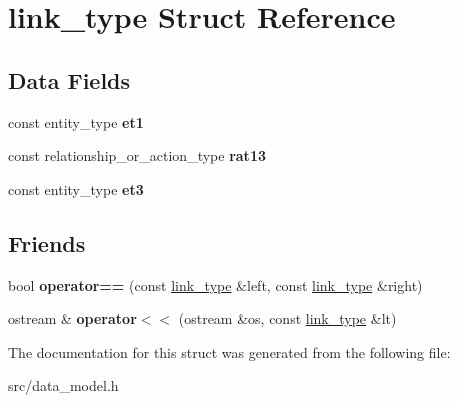 \hypertarget{structlink__type}{}\section{link\+\_\+type Struct Reference}
\label{structlink__type}
\subsection*{Data Fields}
\begin{DoxyCompactItemize}
\item 
\mbox{\label{structlink__type_aa1e1406306efb10b6c71e6425df2405d}} 
const entity\+\_\+type {\bfseries et1}
\item 
\mbox{\label{structlink__type_ac178aea7e3b72e3579ea365625291c4a}} 
const relationship\+\_\+or\+\_\+action\+\_\+type {\bfseries rat13}
\item 
\mbox{\label{structlink__type_a5d2db20b11fedaab93e193fce2e205a8}} 
const entity\+\_\+type {\bfseries et3}
\end{DoxyCompactItemize}
\subsection*{Friends}
\begin{DoxyCompactItemize}
\item 
\mbox{\label{structlink__type_ae75460e218908d70af1163248317096e}} 
bool {\bfseries operator==} (const \hyperlink{structlink__type}{link\+\_\+type} \&left, const \hyperlink{structlink__type}{link\+\_\+type} \&right)
\item 
\mbox{\label{structlink__type_a3b1d9aca31b4d38961fafd8f10732bea}} 
ostream \& {\bfseries operator$<$$<$} (ostream \&os, const \hyperlink{structlink__type}{link\+\_\+type} \&lt)
\end{DoxyCompactItemize}


The documentation for this struct was generated from the following file\+:\begin{DoxyCompactItemize}
\item 
src/data\+\_\+model.\+h\end{DoxyCompactItemize}
